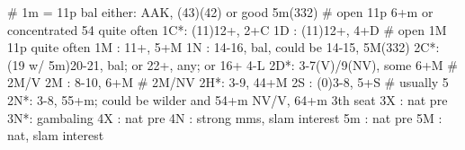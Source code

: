 # 1m = 11p bal either: AAK, (43)(42) or good 5m(332)
# open 11p 6+m or concentrated 54 quite often
1C*: (11)12+, 2+C
1D : (11)12+, 4+D
# open 1M 11p quite often
1M : 11+, 5+M
1N : 14-16, bal, could be 14-15, 5M(332)
2C*: (19 w/ 5m)20-21, bal; or 22+, any; or 16+ 4-L
2D*: 3-7(V)/9(NV), some 6+M
# 2M/V
2M : 8-10, 6+M
# 2M/NV
2H*: 3-9, 44+M
2S : (0)3-8, 5+S  # usually 5
2N*: 3-8, 55+m; could be wilder and 54+m NV/V, 64+m 3th seat 
3X : nat pre
3N*: gambaling
4X : nat pre
4N : strong mms, slam interest
5m : nat pre
5M : nat, slam interest
